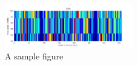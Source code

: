 \begin{figure}[H] 
    \includegraphics[width=0.5\textwidth]{./fig/pic/pic.png}
    \caption{A sample figure}
\end{figure}
